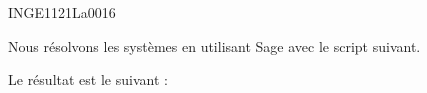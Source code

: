 

\begin{corrige}{INGE1121La0016}

	Nous résolvons les systèmes en utilisant Sage avec le script suivant.


Le résultat est le suivant :



\end{corrige}
